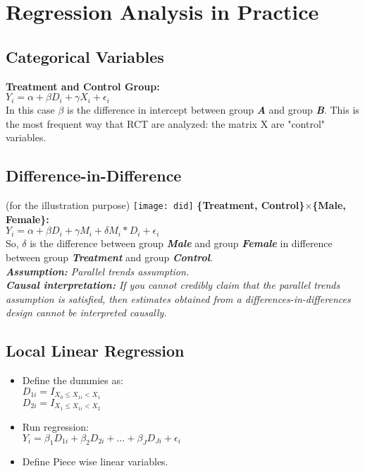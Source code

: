 \section{Regression Analysis in Practice}

\subsection*{Categorical Variables}
\textbf{Treatment and Control Group: } \\
$Y_i=\alpha+\beta D_i + \gamma X_i + \epsilon_i$\\
In this case $\beta$ is the difference in intercept between group \textbf{\textit{A}} and group \textbf{\textit{B}}. This is the most frequent way that RCT are analyzed: the matrix X are "control" variables. 

\subsection*{Difference-in-Difference}
(for the illustration purpose)
\texttt{[image: did]}
\textbf{\{Treatment, Control\}$\times$\{Male, Female\}: } \\
$Y_i=\alpha+\beta D_i + \gamma M_i + \delta M_i \ast D_i + \epsilon_i$ \\
So, $\delta$ is the difference between group \textbf{\textit{Male}} and group \textbf{\textit{Female}} in difference between group \textbf{\textit{Treatment}} and group \textbf{\textit{Control}}. \\
\textit{\textbf{Assumption: }Parallel trends assumption. }\\
\textit{\textbf{Causal interpretation: }If you cannot credibly claim that the parallel trends assumption is satisfied, then estimates obtained from a differences-in-differences design cannot be interpreted causally. }

\subsection*{Local Linear Regression}
\begin{itemize}
    \item Define the dummies as: \\
    $D_{1i} = I_{X_0 \leq X_{1i} < X_1}$\\
    $D_{2i} = I_{X_1 \leq X_{1i} < X_2}$
    \item Run regression: \\
    $Y_i=\beta_1 D_{1i} + \beta_2 D_{2i} + \dots + \beta_J D_{Ji} + \epsilon_i$
    \item Define Piece wise linear variables. 
\end{itemize}

